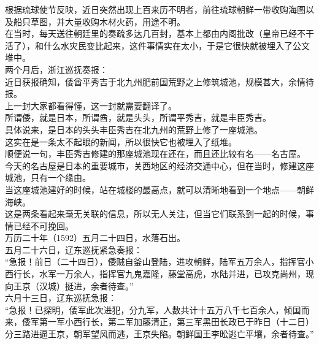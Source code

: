 \begin{multicols}{\theparacolNo}
根据琉球使节反映，近日突然出现上百来历不明者，前往琉球朝鲜一带收购海图以及船只草图，并大量收购木材火药，用途不明。\\

在当时，每天送往朝廷里的奏疏多达几百封，基本上都由内阁批改（皇帝已经不干活了），和什么水灾民变比起来，这件事情实在太小，于是它很快就被埋入了公文堆中。\\

两个月后，浙江巡抚奏报：\\

近日获报确知，倭酋平秀吉于北九州肥前国荒野之上修筑城池，规模甚大，余情待报。\\

上一封大家都看得懂，这一封就需要翻译了。\\

所谓倭，就是日本，所谓酋，就是头头，所谓平秀吉，就是丰臣秀吉。\\

具体说来，是日本的头头丰臣秀吉在北九州的荒野上修了一座城池。\\

这实在是一条太不起眼的新闻，所以很快它也被埋入了纸堆。\\

顺便说一句，丰臣秀吉修建的那座城池现在还在，而且还比较有名——名古屋。\\

今天的名古屋是日本的重要城市，关西地区的经济交通中心，但在当时，修建这座城池，只有一个缘由。\\

当这座城池建好的时候，站在城楼的最高点，就可以清晰地看到一个地点——朝鲜海峡。\\

这是两条看起来毫无关联的信息，所以无人关注，但当它们联系到一起的时候，事情已经不可挽回。\\

万历二十年（1592）五月二十四日，水落石出。\\

五月二十六日，辽东巡抚紧急奏报：\\

“急报！前日（二十四日），倭贼自釜山登陆，进攻朝鲜，陆军五万余人，指挥官小西行长，水军一万余人，指挥官九鬼嘉隆，藤堂高虎，水陆并进，已攻克尚州，现向王京（汉城）挺进，余者待查。”\\

六月十三日，辽东巡抚急报：\\

“急报！已探明，倭军此次进犯，分九军，人数共计十五万八千七百余人，倾国而来，倭军第一军小西行长，第二军加藤清正，第三军黑田长政已于昨日（十二日）分三路进逼王京，朝军望风而逃，王京失陷。朝鲜国王李昖逃亡平壤，余者待查。”\\


\end{multicols}
